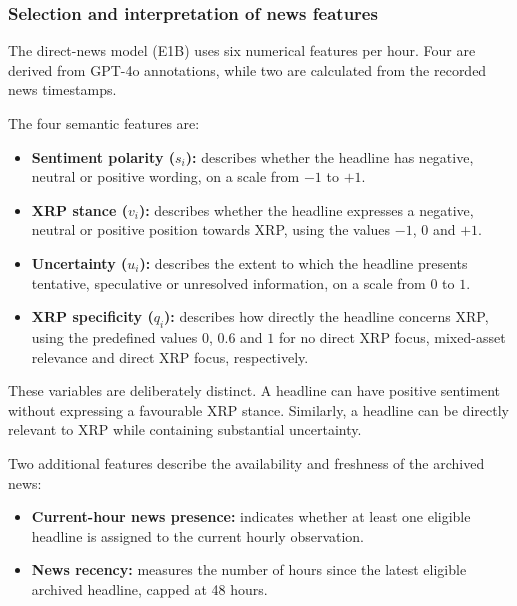 \subsubsection{Selection and interpretation of news features}

The direct-news model (E1B) uses six numerical features per hour. Four are derived from GPT-4o annotations, while two are calculated from the recorded news timestamps.

The four semantic features are:

\begin{itemize}
\item \textbf{Sentiment polarity ($s_i$):} describes whether the headline has negative, neutral or positive wording, on a scale from $-1$ to $+1$.

\item \textbf{XRP stance ($v_i$):} describes whether the headline expresses a negative, neutral or positive position towards XRP, using the values $-1$, $0$ and $+1$.

\item \textbf{Uncertainty ($u_i$):} describes the extent to which the headline presents tentative, speculative or unresolved information, on a scale from $0$ to $1$.

\item \textbf{XRP specificity ($q_i$):} describes how directly the headline concerns XRP, using the predefined values $0$, $0.6$ and $1$ for no direct XRP focus, mixed-asset relevance and direct XRP focus, respectively.
\end{itemize}

These variables are deliberately distinct. A headline can have positive sentiment without expressing a favourable XRP stance. Similarly, a headline can be directly relevant to XRP while containing substantial uncertainty.

Two additional features describe the availability and freshness of the archived news:

\begin{itemize}
\item \textbf{Current-hour news presence:} indicates whether at least one eligible headline is assigned to the current hourly observation.

\item \textbf{News recency:} measures the number of hours since the latest eligible archived headline, capped at 48 hours.
\end{itemize}

